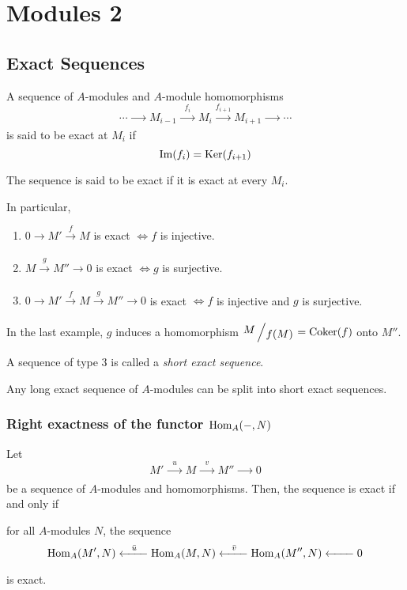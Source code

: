 \chapter*{Modules 2}  \label{ch:modules2}

\section{Exact Sequences}
A sequence of \(A\)-modules and \(A\)-module homomorphisms
\[
	\cdots \xrightarrow[\quad\quad]{} M_{i-1} \xrightarrow[\quad\quad]{f_i}
	M_i \xrightarrow[\quad\quad]{f_{i+1}} M_{i+1}
	\xrightarrow[\quad\quad]{} \cdots
\]
is said to be exact at \(M_i\) if
\[
	\operatorname{Im}(f_i) = \operatorname{Ker}(f_{i+1})
\]

The sequence is said to be exact if it is exact at every \(M_i\).

In particular,
\begin{enumerate}
	\item \(0 \xrightarrow[\quad]{} M' \xrightarrow[\quad]{f} M\)
	is exact \(\iff f\) is injective.
	\item \(M \xrightarrow[\quad]{g} M'' \xrightarrow[\quad]{} 0\)
	is exact \(\iff g\) is surjective.
	\item \(0 \xrightarrow[\quad]{} M' \xrightarrow[\quad]{f} M
	\xrightarrow[\quad]{g} M'' \xrightarrow[\quad]{} 0\)
	is exact \(\iff f\) is injective and \(g\) is surjective.
\end{enumerate}
In the last example, \(g\) induces a homomorphism
\(\bigslant{M}{f(M)} = \Coker(f)\) onto \(M''\).

A sequence of type 3 is called a \emph{short exact sequence}.

Any long exact sequence of \(A\)-modules can be split into
short exact sequences.


\subsection{Right exactness of the functor \(\operatorname{Hom}_A(-, N)\)}

\begin{proposition}{}{}
	Let
	\[
		M' \xrightarrow[\quad\quad]{u} M \xrightarrow[\quad\quad]{v} M''
		\xrightarrow[\quad\quad]{} 0
	\]
	be a sequence of \(A\)-modules and homomorphisms.
	Then, the sequence is exact if and only if

	for all \(A\)-modules \(N\), the sequence
	\[
		\operatorname{Hom}_A(M', N) \xleftarrow[\quad\quad]{\bar{u}} \operatorname{Hom}_A(M, N)
		\xleftarrow[\quad\quad]{\bar{v}} \operatorname{Hom}_A(M'', N)
		\xleftarrow[\quad\quad]{} 0
	\]
	is exact.
\end{proposition}

